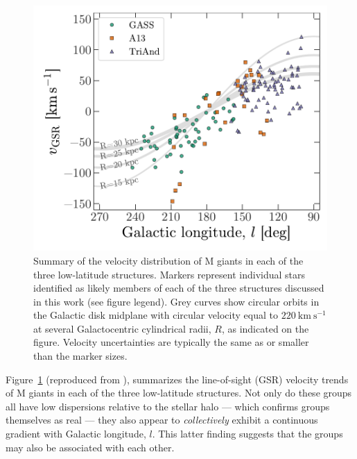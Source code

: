 \documentclass[galaxies,article,submit,moreauthors,pdftex,10pt,a4paper]{mdpi}
\newcommand{\kms}{\mathrm{km}~\mathrm{s}^{-1}}
\begin{document}
\begin{figure}[!ht]
\centering
\includegraphics[width=5 in]{figures/vgsr.pdf}
\caption{\label{fig:ting_vel}
Summary of the velocity distribution of M giants in each of the three
low-latitude structures.
Markers represent individual stars identified as likely members of each of the
three structures discussed in this work (see figure legend).
Grey curves show circular orbits in the Galactic disk midplane with circular
velocity equal to $220~\kms$ at several Galactocentric cylindrical radii, $R$,
as indicated on the figure.
Velocity uncertainties are typically the same as or smaller than the marker
sizes.
}
\end{figure}


Figure~\ref{fig:ting_vel} (reproduced from \cite{li17}), summarizes the line-of-sight (GSR) velocity trends of M giants in each of the three low-latitude structures.
Not only do these groups all have low dispersions relative to the stellar halo
--- which confirms  groups themselves as real --- they also
appear to {\it collectively} exhibit a continuous gradient with Galactic longitude,
$l$.
This latter finding suggests that the groups may also be associated with each other.

\end{document}
